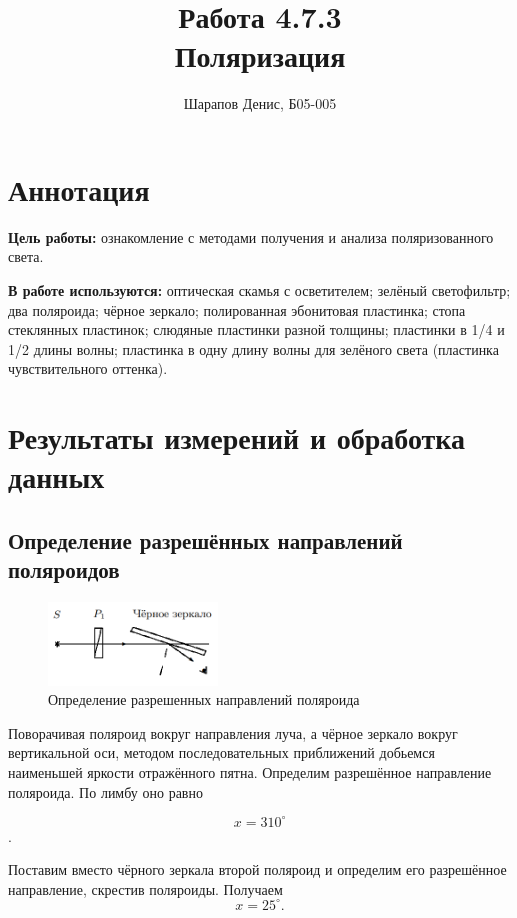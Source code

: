 \documentclass[a4paper]{article}
\title{Работа 4.7.3 \\ Поляризация}
\author{Шарапов Денис, Б05-005}
\date{}
\begin{document}
    \maketitle
    \tableofcontents
    \newpage
    
\section{Аннотация}

\noindent\textbf{Цель работы:} ознакомление с методами получения и анализа поляризованного света. \smallskip
 
\noindent \textbf{В работе используются:} оптическая скамья с осветителем; зелёный светофильтр; два поляроида; чёрное зеркало; полированная эбонитовая пластинка; стопа стеклянных пластинок; слюдяные пластинки разной толщины; пластинки в 1/4 и 1/2 длины волны; пластинка в одну длину волны для зелёного света (пластинка чувствительного оттенка).

\section{Результаты измерений и обработка данных}

\subsection{Определение разрешённых направлений поляроидов}

\begin{figure}[ht!]
    \centering
    \includegraphics[width = 0.40\textwidth]{image/pic1.png}
    \caption{Определение разрешенных направлений поляроида}
\end{figure}

\noindent Поворачивая поляроид вокруг направления луча, а чёрное зеркало вокруг вертикальной оси, методом последовательных приближений добьемся наименьшей яркости отражённого пятна. Определим разрешённое направление поляроида. По лимбу оно равно

$$ x = 310^{\circ} $$. 

\noindent Поставим вместо чёрного зеркала второй поляроид и определим
его разрешённое направление, скрестив поляроиды. Получаем $$ x = 25^{\circ}.$$
 
\end{document}
